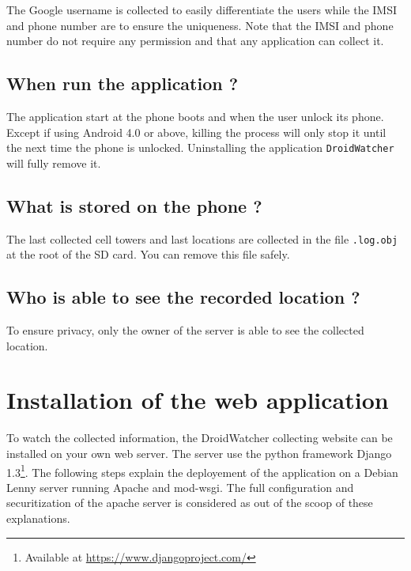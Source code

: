 The Google username is collected to easily differentiate the users while the IMSI and phone number are to ensure the uniqueness.
Note that the IMSI and phone number do not require any permission and that any application can collect it.

\subsection{When run the application ?}

The application start at the phone boots and when the user unlock its phone.
Except if using Android 4.0 or above, killing the process will only stop it until the next time the phone is unlocked.
Uninstalling the application \texttt{DroidWatcher} will fully remove it.

\subsection{What is stored on the phone ?}

The last collected cell towers and last locations are collected in the file \texttt{.log.obj} at the root of the SD card. You can remove this file safely.

\subsection{Who is able to see the recorded location ?}

To ensure privacy, only the owner of the server is able to see the collected location.

\section{Installation of the web application}

To watch the collected information, the DroidWatcher collecting website can be installed on your own web server.
The server use the python framework Django 1.3\footnote{Available at \url{https://www.djangoproject.com/}}.
The following steps explain the deployement of the application on a Debian Lenny server running Apache and mod-wsgi. The full configuration and securitization of the apache server is considered as out of the scoop of these explanations.

